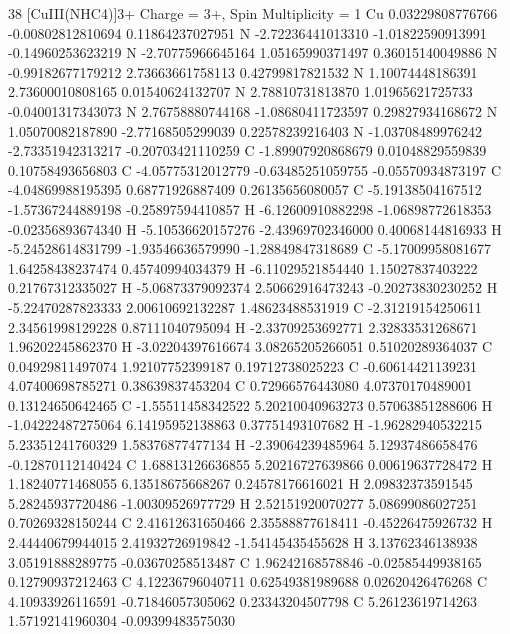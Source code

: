 \documentclass{article}
\begin{document}
38 
[CuIII(NHC4)]3+ 
Charge = 3+, Spin Multiplicity = 1 
  Cu  0.03229808776766     -0.00802812810694      0.11864237027951 
  N   -2.72236441013310     -1.01822590913991     -0.14960253623219 
  N   -2.70775966645164      1.05165990371497      0.36015140049886 
  N   -0.99182677179212      2.73663661758113      0.42799817821532 
  N   1.10074448186391      2.73600010808165      0.01540624132707 
  N   2.78810731813870      1.01965621725733     -0.04001317343073 
  N   2.76758880744168     -1.08680411723597      0.29827934168672 
  N   1.05070082187890     -2.77168505299039      0.22578239216403 
  N   -1.03708489976242     -2.73351942313217     -0.20703421110259 
  C   -1.89907920868679      0.01048829559839      0.10758493656803 
  C   -4.05775312012779     -0.63485251059755     -0.05570934873197 
  C   -4.04869988195395      0.68771926887409      0.26135656080057 
  C   -5.19138504167512     -1.57367244889198     -0.25897594410857 
  H   -6.12600910882298     -1.06898772618353     -0.02356893674340 
  H   -5.10536620157276     -2.43969702346000      0.40068144816933 
  H   -5.24528614831799     -1.93546636579990     -1.28849847318689 
  C   -5.17009958081677      1.64258438237474      0.45740994034379 
  H   -6.11029521854440      1.15027837403222      0.21767312335027 
  H   -5.06873379092374      2.50662916473243     -0.20273830230252 
  H   -5.22470287823333      2.00610692132287      1.48623488531919 
  C   -2.31219154250611      2.34561998129228      0.87111040795094 
  H   -2.33709253692771      2.32833531268671      1.96202245862370 
  H   -3.02204397616674      3.08265205266051      0.51020289364037 
  C   0.04929811497074      1.92107752399187      0.19712738025223 
  C   -0.60614421139231      4.07400698785271      0.38639837453204 
  C   0.72966576443080      4.07370170489001      0.13124650642465 
  C   -1.55511458342522      5.20210040963273      0.57063851288606 
  H   -1.04222487275064      6.14195952138863      0.37751493107682 
  H   -1.96282940532215      5.23351241760329      1.58376877477134 
  H   -2.39064239485964      5.12937486658476     -0.12870112140424 
  C   1.68813126636855      5.20216727639866      0.00619637728472 
  H   1.18240771468055      6.13518675668267      0.24578176616021 
  H   2.09832373591545      5.28245937720486     -1.00309526977729 
  H   2.52151920070277      5.08699086027251      0.70269328150244 
  C   2.41612631650466      2.35588877618411     -0.45226475926732 
  H   2.44440679944015      2.41932726919842     -1.54145435455628 
  H   3.13762346138938      3.05191888289775     -0.03670258513487 
  C   1.96242168578846     -0.02585449938165      0.12790937212463 
  C   4.12236796040711      0.62549381989688      0.02620426476268 
  C   4.10933926116591     -0.71846057305062      0.23343204507798 
  C   5.26123619714263      1.57192141960304     -0.09399483575030 
\end{document}
